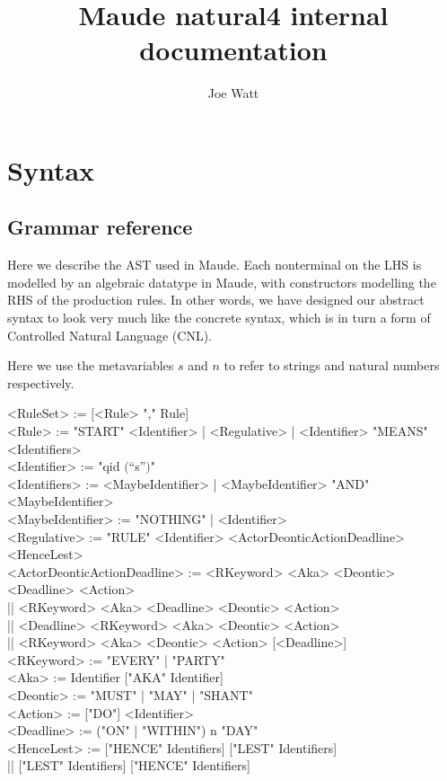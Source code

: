 \documentclass{article}
\title{Maude natural4 internal documentation}
\author{Joe Watt}
\begin{document}
\maketitle


\tableofcontents

\newpage

\section{Syntax}

\subsection{Grammar reference}
Here we describe the AST used in Maude.
Each nonterminal on the LHS is modelled by an algebraic datatype in Maude, with
constructors modelling the RHS of the production rules.
In other words, we have designed our abstract syntax to look very much like
the concrete syntax, which is in turn a form of Controlled Natural Language (CNL).

Here we use the metavariables $s$ and $n$ to refer to strings and
natural numbers respectively.

\begin{ebnf}
  <RuleSet> := [{<Rule> ","} Rule] \\
  <Rule> :=
    "START" <Identifier>
    | <Regulative>
    | <Identifier> "MEANS" <Identifiers>
  \\
  <Identifier> := "qid $\lparen$``s''$\rparen$"
  \\
  <Identifiers> :=
    <MaybeIdentifier>
    | {<MaybeIdentifier> "AND"} <MaybeIdentifier>
  \\
  <MaybeIdentifier> := "NOTHING" | <Identifier>
  \\
  <Regulative> :=
    "RULE" <Identifier>
    <ActorDeonticActionDeadline>
    <HenceLest>
  \\
  <ActorDeonticActionDeadline> :=
  <RKeyword> <Aka> <Deontic> <Deadline> <Action> \\
    || <RKeyword> <Aka> <Deadline> <Deontic> <Action> \\
    || <Deadline> <RKeyword> <Aka> <Deontic> <Action> \\
    || <RKeyword> <Aka> <Deontic> <Action> [<Deadline>]
  \\
  <RKeyword> := "EVERY" | "PARTY"
  \\
  <Aka> := Identifier ["AKA" Identifier]
  \\
  <Deontic> := "MUST" | "MAY" | "SHANT"
  \\
  <Action> := ["DO"] <Identifier>
  \\
  <Deadline> := ("ON" | "WITHIN") n "DAY"
  \\
  <HenceLest> := ["HENCE" Identifiers] ["LEST" Identifiers] \\
    || ["LEST" Identifiers] ["HENCE" Identifiers]
\end{ebnf}
\end{document}
